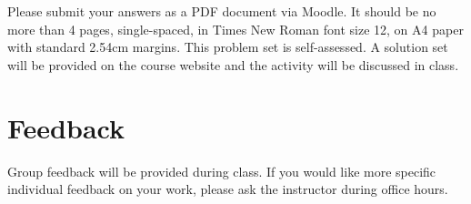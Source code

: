 \documentclass[a4paper]{exam}
\begin{document}
Please submit your answers as a PDF document via Moodle. It should be no more than 4 pages, single-spaced, in Times New Roman font size 12, on A4 paper with standard 2.54cm margins. This problem set is self-assessed. A solution set will be provided on the course website and the activity will be discussed in class.

\section{Feedback}\label{feedback}

Group feedback will be provided during class. If you would like more specific individual feedback on your work, please ask the instructor during office hours.
\end{document}
